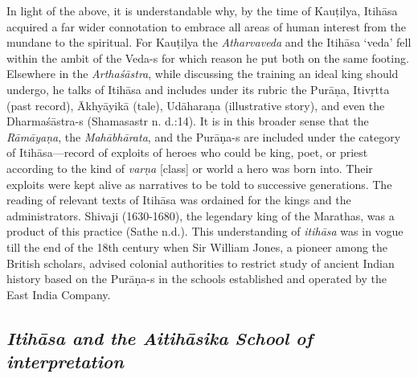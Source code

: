 In light of the above, it is understandable why, by the time of Kauṭilya, Itihāsa acquired a far wider connotation to embrace all areas of human interest from the mundane to the spiritual. For Kauṭilya the \textit{Atharvaveda} and the Itihāsa ‘veda’ fell within the ambit of the Veda-s for which reason he put both on the same footing. Elsewhere in the \textit{Arthaśāstra}, while discussing the training an ideal king should undergo, he talks of Itihāsa and includes under its rubric the Purāṇa, Itivṛtta (past record), Ākhyāyikā (tale), Udāharaṇa (illustrative story), and even the Dharmaśāstra-s (Shamasastr n. d.:14). It is in this broader sense that the \textit{Rāmāyaṇa}, the \textit{Mahābhārata}, and the Purāṇa-s are included under the category of Itihāsa—record of exploits of heroes who could be king, poet, or priest according to the kind of \textit{varṇa} [class] or world a hero was born into. Their exploits were kept alive as narratives to be told to successive generations. The reading of relevant texts of Itihāsa was ordained for the kings and the administrators. Shivaji (1630-1680), the legendary king of the Marathas, was a product of this practice (Sathe n.d.). This understanding of \textit{itihāsa} was in vogue till the end of the 18th century when Sir William Jones, a pioneer among the British scholars, advised colonial authorities to restrict study of ancient Indian history based on the Purāṇa-s in the schools established and operated by the East India Company.


\subsection*{\textit{Itihāsa and the Aitihāsika School of interpretation}}


